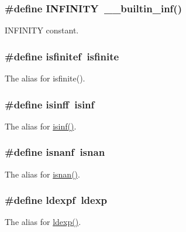 \subsubsection[{\texorpdfstring{I\+N\+F\+I\+N\+I\+TY}{INFINITY}}]{\setlength{\rightskip}{0pt plus 5cm}\#define I\+N\+F\+I\+N\+I\+TY~\+\_\+\+\_\+builtin\+\_\+inf()}\hypertarget{group__avr__math_ga956e2723d559858d08644ac99146e910}{}\label{group__avr__math_ga956e2723d559858d08644ac99146e910}
I\+N\+F\+I\+N\+I\+TY constant. 
\subsubsection[{\texorpdfstring{isfinitef}{isfinitef}}]{\setlength{\rightskip}{0pt plus 5cm}\#define isfinitef~isfinite}\hypertarget{group__avr__math_ga9e007830d194ee4b5f0a27d2112a0c53}{}\label{group__avr__math_ga9e007830d194ee4b5f0a27d2112a0c53}
The alias for isfinite(). 
\subsubsection[{\texorpdfstring{isinff}{isinff}}]{\setlength{\rightskip}{0pt plus 5cm}\#define isinff~{\bf isinf}}\hypertarget{group__avr__math_gaf048a8eca1cce97556a96c532c0d2b56}{}\label{group__avr__math_gaf048a8eca1cce97556a96c532c0d2b56}
The alias for \hyperlink{group__avr__math_ga7958c6f2498eaf51798f80de9fcfe9d0}{isinf()}. 
\subsubsection[{\texorpdfstring{isnanf}{isnanf}}]{\setlength{\rightskip}{0pt plus 5cm}\#define isnanf~{\bf isnan}}\hypertarget{group__avr__math_gaf3c3e624db1ecfe93b86972bca1dc4b3}{}\label{group__avr__math_gaf3c3e624db1ecfe93b86972bca1dc4b3}
The alias for \hyperlink{group__avr__math_gafa5b3d99af3bf027f5742e5c0e6b7095}{isnan()}. 
\subsubsection[{\texorpdfstring{ldexpf}{ldexpf}}]{\setlength{\rightskip}{0pt plus 5cm}\#define ldexpf~{\bf ldexp}}\hypertarget{group__avr__math_ga374c9d6918a8bc1f8bbe054940795e0f}{}\label{group__avr__math_ga374c9d6918a8bc1f8bbe054940795e0f}
The alias for \hyperlink{group__avr__math_ga71765b713504b7c380b1720e0ac909cc}{ldexp()}. 
